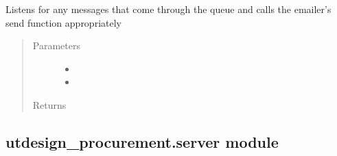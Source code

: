 \documentclass[letterpaper,10pt,english]{sphinxmanual}
\begin{document}
\begin{fulllineitems}
\label{\detokenize{apidoc/utdesign_procurement:utdesign_procurement.emailer.email_listen}}
Listens for any messages that come through the queue and calls the
emailer’s send function appropriately
\begin{quote}\begin{description}
\item[{Parameters}] \leavevmode\begin{itemize}
\item {} 
 \textendash{} 

\item {} 
 \textendash{} 

\end{itemize}

\item[{Returns}] \leavevmode


\end{description}\end{quote}

\end{fulllineitems}



\subsection{utdesign\_procurement.server module}
\label{\detokenize{apidoc/utdesign_procurement:module-utdesign_procurement.server}}\label{\detokenize{apidoc/utdesign_procurement:utdesign-procurement-server-module}}
\end{document}
